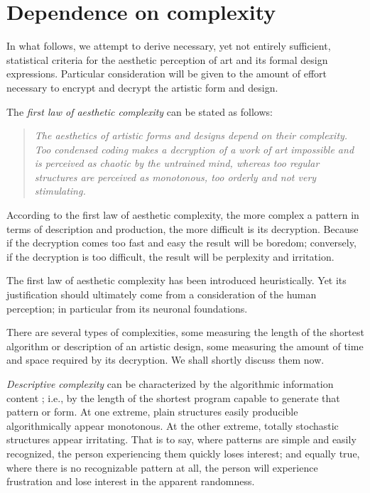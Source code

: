 \documentclass[rmp,amssymb,showpacs,showkeys,12pt,preprint]{revtex4}
\begin{document}
\section{Dependence on complexity}


In what follows, we attempt to derive necessary, yet not entirely sufficient, statistical criteria for the aesthetic perception of art and its formal design expressions.
Particular consideration will be given to the amount of effort necessary to encrypt and decrypt the artistic form and design.

The  \textit{first law of aesthetic complexity} can be stated as follows:
\begin{quote}
{\em
The aesthetics of artistic forms and designs depend on their complexity.
Too condensed coding makes a decryption of a work of art impossible and is perceived as chaotic by the untrained mind, whereas too regular structures are perceived as monotonous, too orderly and not very stimulating.
}
\end{quote}

According to the first law of aesthetic complexity, the more complex a pattern in terms of description and production, the more difficult is its decryption.
Because if the decryption comes too fast and easy the result will be boredom;
conversely, if the decryption is too difficult, the result will be perplexity and irritation.

The first law  of aesthetic complexity has been introduced heuristically.
Yet its justification should ultimately come from a consideration of the human perception; in particular from its neuronal foundations.

There are several types of complexities, some measuring the length of the shortest algorithm or description of an artistic design, some measuring the amount of time and space required by its decryption.
We shall shortly discuss them now.

\textit{Descriptive complexity} can be characterized by the algorithmic information content
\cite{chaitin2,chaitin3,calude:02};
i.e., by the length of the shortest program capable to generate that pattern or form.
At one extreme, plain structures easily producible algorithmically appear monotonous.
At the other extreme, totally stochastic structures
appear irritating. That is to say, where patterns are simple and easily
recognized, the person experiencing them quickly loses interest; and equally
true, where there is no recognizable pattern at all, the person will experience frustration and lose interest in the apparent randomness.
\end{document}
